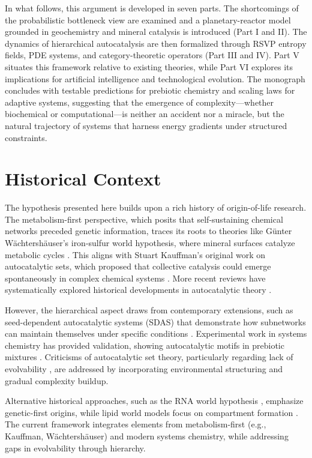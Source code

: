 \documentclass[openany]{book}
\begin{document}
In what follows, this argument is developed in seven parts. The shortcomings of the probabilistic bottleneck view are examined and a planetary-reactor model grounded in geochemistry and mineral catalysis is introduced (Part I and II). The dynamics of hierarchical autocatalysis are then formalized through RSVP entropy fields, PDE systems, and category-theoretic operators (Part III and IV). Part V situates this framework relative to existing theories, while Part VI explores its implications for artificial intelligence and technological evolution. The monograph concludes with testable predictions for prebiotic chemistry and scaling laws for adaptive systems, suggesting that the emergence of complexity—whether biochemical or computational—is neither an accident nor a miracle, but the natural trajectory of systems that harness energy gradients under structured constraints.

\section{Historical Context}
The hypothesis presented here builds upon a rich history of origin-of-life research. The metabolism-first perspective, which posits that self-sustaining chemical networks preceded genetic information, traces its roots to theories like Günter Wächtershäuser's iron-sulfur world hypothesis, where mineral surfaces catalyze metabolic cycles \citep{wachtershauser1988}. This aligns with Stuart Kauffman's original work on autocatalytic sets, which proposed that collective catalysis could emerge spontaneously in complex chemical systems \citep{kauffman1993}. More recent reviews have systematically explored historical developments in autocatalytic theory \citep{hordijk2013}.

However, the hierarchical aspect draws from contemporary extensions, such as seed-dependent autocatalytic systems (SDAS) that demonstrate how subnetworks can maintain themselves under specific conditions \citep{peng2022}. Experimental work in systems chemistry has provided validation, showing autocatalytic motifs in prebiotic mixtures \citep{semenov2016, sokolskyi2024}. Criticisms of autocatalytic set theory, particularly regarding lack of evolvability \citep{vasas2010}, are addressed by incorporating environmental structuring and gradual complexity buildup.

Alternative historical approaches, such as the RNA world hypothesis \citep{joyce1989}, emphasize genetic-first origins, while lipid world models focus on compartment formation \citep{deamer2017}. The current framework integrates elements from metabolism-first (e.g., Kauffman, Wächtershäuser) and modern systems chemistry, while addressing gaps in evolvability through hierarchy.
\end{document}
